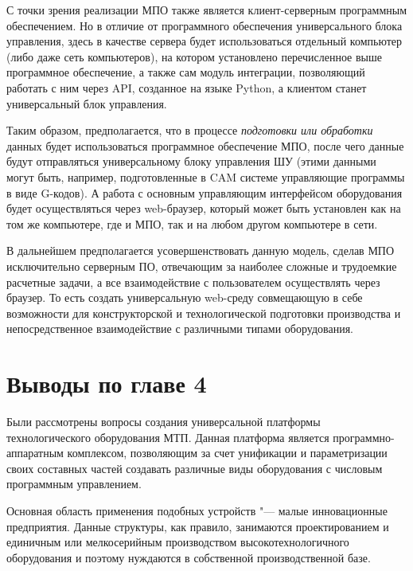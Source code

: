 С точки зрения реализации \foreignlanguage{english}{МПО} также является клиент-серверным программным обеспечением. Но в отличие от программного обеспечения универсального блока управления, здесь в качестве сервера будет использоваться отдельный компьютер (либо даже сеть компьютеров), на котором установлено перечисленное выше программное обеспечение, а также сам модуль интеграции, позволяющий работать с ним через \foreignlanguage{english}{API}, созданное на языке \foreignlanguage{english}{Python}, а клиентом станет универсальный блок управления.

Таким образом, предполагается, что в процессе \textit{подготовки или обработки} данных будет использоваться программное обеспечение \foreignlanguage{english}{МПО}, после чего данные будут отправляться универсальному блоку управления ШУ (этими данными могут быть, например, подготовленные в \foreignlanguage{english}{CAM} системе управляющие программы в виде \foreignlanguage{english}{G}-кодов). А работа с основным управляющим интерфейсом оборудования будет осуществляться через \foreignlanguage{english}{web}-браузер, который может быть установлен как на том же компьютере, где и \foreignlanguage{english}{МПО}, так и на любом другом компьютере в сети.

В дальнейшем предполагается усовершенствовать данную модель, сделав \foreignlanguage{english}{МПО} исключительно серверным ПО, отвечающим за наиболее сложные и трудоемкие расчетные задачи, а все взаимодействие с пользователем осуществлять через браузер. То есть создать универсальную \foreignlanguage{english}{web}-среду совмещающую в себе возможности для конструкторской и технологической подготовки производства и непосредственное взаимодействие с различными типами оборудования.

\section{Выводы по главе 4}

Были рассмотрены вопросы создания универсальной платформы технологического оборудования МТП. Данная платформа является программно-аппаратным комплексом, позволяющим за счет унификации и параметризации своих составных частей создавать различные виды оборудования с числовым программным управлением.

Основная область применения подобных устройств "--- малые инновационные предприятия. Данные структуры, как правило, занимаются проектированием и единичным или мелкосерийным производством высокотехнологичного оборудования и поэтому нуждаются в собственной производственной базе.

